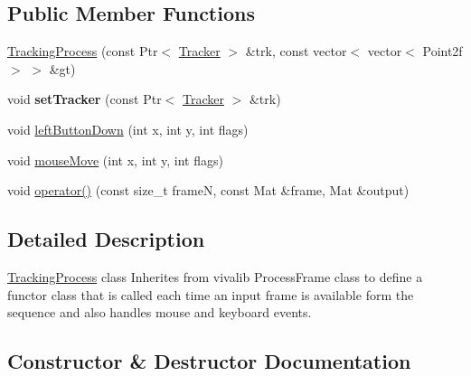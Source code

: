 \subsection*{Public Member Functions}
\begin{DoxyCompactItemize}
\item 
\hyperlink{class_tracking_process_a155da76d3cde928fb05e15de76c93640}{Tracking\+Process} (const Ptr$<$ \hyperlink{class_tracker}{Tracker} $>$ \&trk, const vector$<$ vector$<$ Point2f $>$ $>$ \&gt)
\item 
void {\bfseries set\+Tracker} (const Ptr$<$ \hyperlink{class_tracker}{Tracker} $>$ \&trk)\hypertarget{class_tracking_process_a8e10ca81e6df17389e1bdd7cec852613}{}\label{class_tracking_process_a8e10ca81e6df17389e1bdd7cec852613}

\item 
void \hyperlink{class_tracking_process_a648f36431e7c0932b4befec1fdbc7e44}{left\+Button\+Down} (int x, int y, int flags)
\item 
void \hyperlink{class_tracking_process_a4d1f2b19eda65a24a301ab28e3c56fe2}{mouse\+Move} (int x, int y, int flags)
\item 
void \hyperlink{class_tracking_process_aa4622c0d0e0f4968fc67b414d5989b25}{operator()} (const size\+\_\+t frameN, const Mat \&frame, Mat \&output)
\end{DoxyCompactItemize}


\subsection{Detailed Description}
\hyperlink{class_tracking_process}{Tracking\+Process} class Inherites from vivalib Process\+Frame class to define a functor class that is called each time an input frame is available form the sequence and also handles mouse and keyboard events. 

\subsection{Constructor \& Destructor Documentation}
